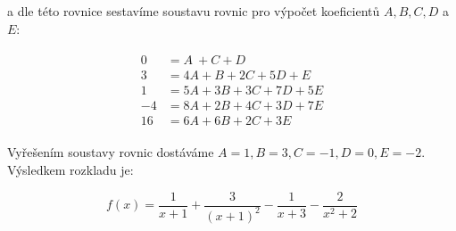 a dle této rovnice sestavíme soustavu rovnic pro výpočet koeficientů $A, B, C, D$ a $E$:

\begin{gather*}
\begin{aligned}
0 &= A~+ C + D\\
3 &= 4A + B + 2C + 5D + E\\
1 &= 5A + 3B + 3C + 7D + 5E\\
-4 &= 8A + 2B + 4C + 3D + 7E\\
16 &= 6A + 6B + 2C + 3E
\end{aligned}
\end{gather*}

Vyřešením soustavy rovnic dostáváme $A=1, B=3, C=-1, D=0, E=-2$. \\Výsledkem rozkladu je:

\begin{displaymath}
f(x)=
\frac{1}{x+1} +
\frac{3}{(x+1)^2} -
\frac{1}{x+3} -
\frac{2}{x^2+2}
\end{displaymath}
